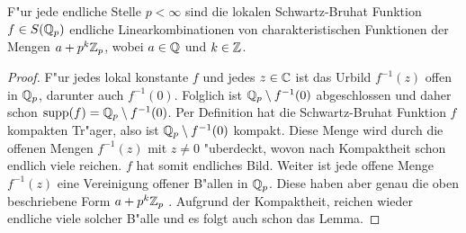 		\begin{lemma}\label{lemma:padischSBF}
			F"ur jede endliche Stelle $p<\infty$ sind die lokalen Schwartz-Bruhat Funktion $f\in S({\mathbb{Q}_p})$ endliche Linearkombinationen von charakteristischen Funktionen der Mengen ${a+p^k{\mathbb{Z}_p}}$, wobei $a\in \mathbb{Q}$ und $k\in \mathbb{Z}$.
		\end{lemma}
		\begin{proof}
			F"ur jedes lokal konstante $f$ und jedes $z\in\mathbb{C}$ ist das Urbild $f^{-1}(z)$ offen in ${\mathbb{Q}_p}$, darunter auch $f^{-1}(0)$. 
			Folglich ist ${\mathbb{Q}_p} \setminus f^{-1}(0)$ abgeschlossen und daher schon $\text{supp}(f) = {\mathbb{Q}_p} \setminus f^{-1}(0)$. 
			Per Definition hat die Schwartz-Bruhat Funktion $f$ kompakten Tr"ager, also ist ${\mathbb{Q}_p} \setminus f^{-1}(0)$ kompakt. 
			Diese Menge wird durch die offenen Mengen $f^{-1} (z)$ mit $z\not= 0$ "uberdeckt, wovon nach Kompaktheit schon endlich viele reichen.
			$f$ hat somit endliches Bild. 
			Weiter ist jede offene Menge $f^{-1} (z)$ eine Vereinigung offener B"allen in ${\mathbb{Q}_p}$. 
			Diese haben aber genau die oben beschriebene Form $a+p^k{\mathbb{Z}_p}$ . 
			Aufgrund der Kompaktheit, reichen wieder endliche viele solcher B"alle und es folgt auch schon das Lemma.
		\end{proof}
		
